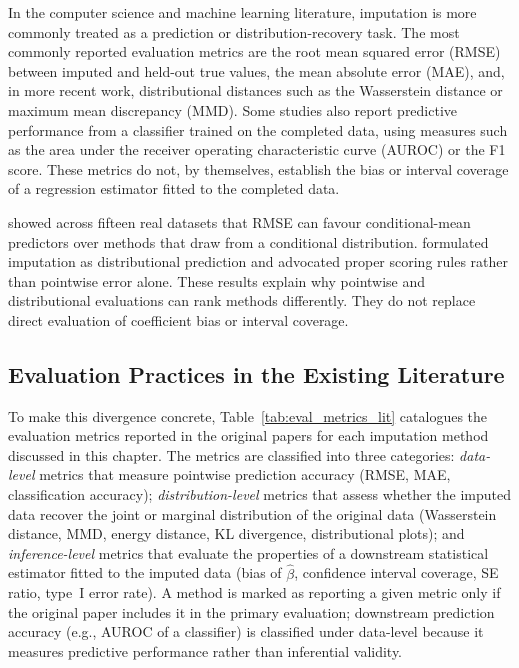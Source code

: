 In the computer science and machine learning literature, imputation is more commonly treated as a prediction or distribution-recovery task. The most commonly reported evaluation metrics are the root mean squared error (RMSE) between imputed and held-out true values, the mean absolute error (MAE), and, in more recent work, distributional distances such as the Wasserstein distance or maximum mean discrepancy (MMD). Some studies also report predictive performance from a classifier trained on the completed data, using measures such as the area under the receiver operating characteristic curve (AUROC) or the F1 score. These metrics do not, by themselves, establish the bias or interval coverage of a regression estimator fitted to the completed data.

\citet{naf2023imputation} showed across fifteen real datasets that RMSE can favour conditional-mean predictors over methods that draw from a conditional distribution. \citet{naf2025mar} formulated imputation as distributional prediction and advocated proper scoring rules rather than pointwise error alone. These results explain why pointwise and distributional evaluations can rank methods differently. They do not replace direct evaluation of coefficient bias or interval coverage.

\subsection{Evaluation Practices in the Existing Literature}
\label{sec:3.5.2}
To make this divergence concrete, Table~\ref{tab:eval_metrics_lit} catalogues the evaluation metrics reported in the original papers for each imputation method discussed in this chapter. The metrics are classified into three categories: \emph{data-level} metrics that measure pointwise prediction accuracy (RMSE, MAE, classification accuracy); \emph{distribution-level} metrics that assess whether the imputed data recover the joint or marginal distribution of the original data (Wasserstein distance, MMD, energy distance, KL divergence, distributional plots); and \emph{inference-level} metrics that evaluate the properties of a downstream statistical estimator fitted to the imputed data (bias of $\hat{\beta}$, confidence interval coverage, SE ratio, type~I error rate). A method is marked as reporting a given metric only if the original paper includes it in the primary evaluation; downstream prediction accuracy (e.g., AUROC of a classifier) is classified under data-level because it measures predictive performance rather than inferential validity.

